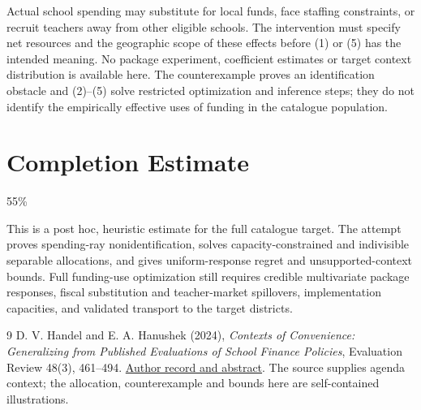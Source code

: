 \documentclass[11pt,a4paper]{article}
\begin{document}
Actual school spending may substitute for local funds, face staffing constraints, or recruit teachers away from other eligible schools. The intervention must specify net resources and the geographic scope of these effects before (1) or (5) has the intended meaning. No package experiment, coefficient estimates or target context distribution is available here. The counterexample proves an identification obstacle and (2)--(5) solve restricted optimization and inference steps; they do not identify the empirically effective uses of funding in the catalogue population.

\section{Completion Estimate}
55\%

This is a post hoc, heuristic estimate for the full catalogue target.
The attempt proves spending-ray nonidentification, solves capacity-constrained and indivisible separable allocations, and gives uniform-response regret and unsupported-context bounds. Full funding-use optimization still requires credible multivariate package responses, fiscal substitution and teacher-market spillovers, implementation capacities, and validated transport to the target districts.

\begin{thebibliography}{9}
 D. V. Handel and E. A. Hanushek (2024), \emph{Contexts of Convenience: Generalizing from Published Evaluations of School Finance Policies}, Evaluation Review 48(3), 461--494. \href{https://www.hanushek.net/publications/contexts-convenience-generalizing-published-evaluations-school-finance-policies-1}{Author record and abstract}. The source supplies agenda context; the allocation, counterexample and bounds here are self-contained illustrations.
\end{thebibliography}
\end{document}
